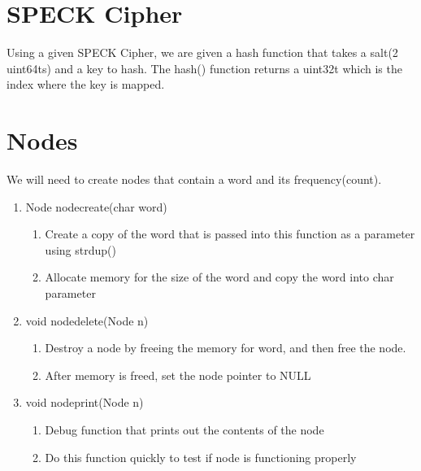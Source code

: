 \documentclass[11pt]{article}
\begin{document}
\section{SPECK Cipher}\label{ss:speck}
Using a given SPECK Cipher, we are given a hash function that takes a salt(2 uint64ts) and a key to hash. The hash() function returns a uint32t which is the index where the key is mapped.

\section{Nodes}\label{ss:nodes}
We will need to create nodes that contain a word and its frequency(count).
\begin{enumerate}
\item Node nodecreate(char word)
	\begin{enumerate}
	\item Create a copy of the word that is passed into this function as a parameter using strdup()
	\item Allocate memory for the size of the word and copy the word into char parameter
	\end{enumerate}
\item void nodedelete(Node n)
	\begin{enumerate}
	\item Destroy a node by freeing the memory for word, and then free the node.
	\item After memory is freed, set the node pointer to NULL
	\end{enumerate}
\item void nodeprint(Node n)
	\begin{enumerate}
	\item Debug function that prints out the contents of the node
	\item Do this function quickly to test if node is functioning properly
	\end{enumerate}
\end{enumerate}
\end{document}
